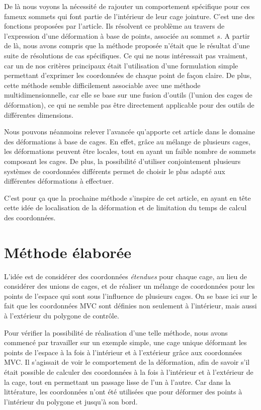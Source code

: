De là nous voyons la nécessité de rajouter un comportement spécifique
pour ces fameux sommets qui font partie de l'intérieur de leur cage
jointure. C'est une des fonctions proposées par l'article. Ils
résolvent ce problème au travers de l'expression d'une déformation à
base de points, associée au sommet $s$. A partir de là, nous avons
compris que la méthode proposée \cite{GPCP13} n'était que le résultat
d'une suite de résolutions de cas spécifiques. Ce qui ne nous
intéressait pas vraiment, car un de nos critères principaux était
l'utilisation d'une formulation simple permettant d'exprimer les
coordonnées de chaque point de façon claire. De plus, cette méthode
semble difficilement associable avec une méthode multidimensionnelle,
car elle se base sur une fusion d'outils (l'union des cages de
déformation), ce qui ne semble pas être directement applicable pour
des outils de différentes dimensions.

Nous pouvons néanmoins relever l'avancée qu'apporte cet article dans
le domaine des déformations à base de cages. En effet, grâce au
mélange de plusieurs cages, les déformations peuvent être locales,
tout en ayant un faible nombre de sommets composant les cages. De
plus, la possibilité d'utiliser conjointement plusieurs systèmes de
coordonnées différents permet de choisir le plus adapté aux
différentes déformations à effectuer.

C'est pour ça que la prochaine méthode s'inspire de cet article, en
ayant en tête cette idée de localisation de la déformation et de
limitation du temps de calcul des coordonnées.

\section{Méthode élaborée}
L'idée est de considérer des coordonnées \textit{étendues} pour chaque
cage, au lieu de considérer des unions de cages, et de réaliser un
mélange de coordonnées pour les points de l'espace qui sont sous
l'influence de plusieurs cages. On se base ici sur le fait que les
coordonnées MVC sont définies non seulement à l'intérieur, mais aussi
à l'extérieur du polygone de contrôle.

Pour vérifier la possibilité de réalisation d'une telle méthode, nous
avons commencé par travailler sur un exemple simple, une cage unique
déformant les points de l'espace à la fois à l'intérieur et à
l'extérieur grâce aux coordonnées MVC. Il s'agissait de voir le
comportement de la déformation, afin de savoir s'il était possible de
calculer des coordonnées à la fois à l'intérieur et à l'extérieur de
la cage, tout en permettant un passage lisse de l'un à l'autre. Car
dans la littérature, les coordonnées n'ont été utilisées que pour
déformer des points à l'intérieur du polygone et jusqu'à son bord.

